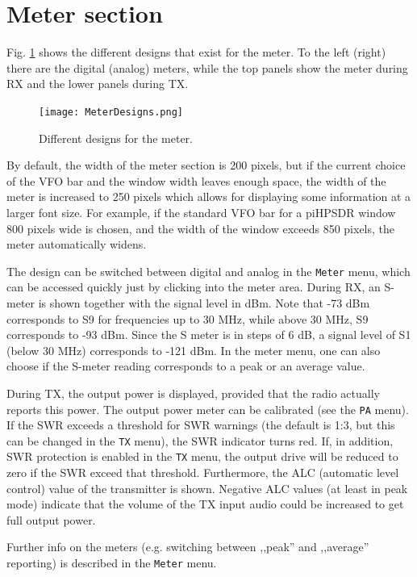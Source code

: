 \documentclass[12pt]{book}
\def\bltt#1{\texttt{\color{blue}#1}}
\def\pH{pi\-HPSDR\xspace}
\begin{document}
\section{Meter section}
\label{sec:MeterSection}
Fig. \ref{fig:MeterDesigns} shows the different designs that exist for
the meter. To the left (right) there are the digital (analog) meters,
while the top panels show the meter during RX and the lower panels
during TX.

\begin{figure}[ht]
\center
\texttt{[image: MeterDesigns.png]}
\caption{Different designs for the meter.}
\label{fig:MeterDesigns}
\end{figure}

By default, the width of the meter section is 200 pixels, but if the current
choice of the VFO bar and the window width leaves enough space, the width
of the meter is increased to 250 pixels which allows for displaying some information
at a larger font size. For example, if the standard VFO bar for a \pH
window 800 pixels wide is chosen, and the width of the window exceeds 850
pixels, the meter automatically widens.

The design can be switched between digital and analog in the \bltt{Meter}
menu, which can be accessed quickly just by clicking into the meter area.
During RX, an S-meter is shown together with the signal level in dBm. Note
that -73 dBm corresponds to S9 for frequencies up to 30 MHz, while above
30 MHz, S9 corresponds to -93 dBm. Since the S meter is in steps of
6 dB, a signal level of S1 (below 30 MHz) corresponds to -121 dBm. In the
meter menu, one can also choose if the S-meter reading corresponds to a peak
or  an average value.

During TX, the output power is displayed, provided that the radio actually
reports this power. The output power meter can be calibrated (see the \bltt{PA}
menu). If the SWR exceeds a threshold for SWR warnings (the default is 1:3, but
this can be changed in the \bltt{TX} menu), the SWR indicator turns red. If,
in addition, SWR protection is enabled in the \bltt{TX} menu, the output
drive  will be reduced to zero if the SWR exceed that threshold.
Furthermore, the ALC (automatic level control) value of the transmitter is
shown. Negative ALC values (at least in peak mode) indicate that the volume of the TX input audio
could be increased to get full output  power.

Further info on the meters (e.g. switching between ,,peak'' and ,,average'' reporting)
is described in the \bltt{Meter} menu.
\end{document}
